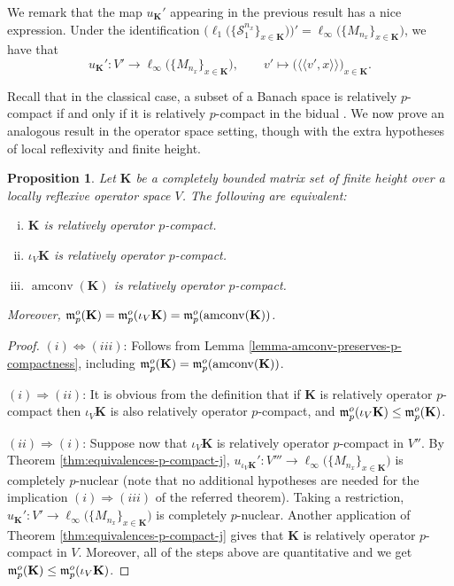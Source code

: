 \documentclass[11pt]{amsart}
\DeclareMathOperator{\amconv}{amconv}
\newcommand{\mpair}[2]{{\langle\langle #1, #2 \rangle\rangle}}
\newtheorem{proposition}[theorem]{Proposition}
\numberwithin{equation}{section}
\begin{document}
We remark that the map $u_{\mathbf{K}}'$ appearing in the previous result has a nice expression. Under the identification $ \big( \ell_1\big( \{ \mathcal{S}^{n_x}_1 \}_{x \in \mathbf{K}}\big) \big)' = \ell_\infty\big( \{ M_{n_x} \}_{x \in \mathbf{K}}\big) $, we have that
$$
u_\mathbf{K}' : V' \to \ell_\infty\big( \{M_{n_x}\}_{x \in \mathbf{K}} \big), \qquad v' \mapsto \big( \mpair{v'}{x}  \big)_{x\in \mathbf{K}}.
$$


Recall that in the classical case, a subset of a Banach space is relatively $p$-compact if and only if it is relatively $p$-compact in the bidual \cite[Thm. 2.4]{Galicer-Lassalle-Turco}.
We now prove an analogous result in the operator space setting, though with the extra hypotheses of local reflexivity and finite height.



\begin{proposition}\label{prop-compactness-in-bidual-for-sets}
Let $\mathbf{K}$ be a completely bounded matrix set of finite height over a locally reflexive operator space $V$.
The following are equivalent:
\begin{enumerate}[(i)]
\item $\mathbf{K}$ is relatively operator $p$-compact.
\item $\iota_V\mathbf{K}$ is relatively operator $p$-compact.
\item $\amconv(\mathbf{K})$ is relatively operator $p$-compact.
\end{enumerate}
Moreover,
$\frak m_p^o(\mathbf{K}) = \frak m_p^o(\iota_V \mathbf{K}) = \frak m_p^o(\amconv(\mathbf{K}))$.
\end{proposition}

\begin{proof}
$(i) \Leftrightarrow (iii)$: Follows from Lemma \ref{lemma-amconv-preserves-p-compactness}, including $\frak m_p^o(\mathbf{K}) = \frak m_p^o(\amconv(\mathbf{K}))$.

$(i) \Rightarrow (ii)$: It is obvious from the definition that if $\mathbf{K}$ is relatively operator $p$-compact then $\iota_V\mathbf{K}$ is also relatively operator $p$-compact, and $\frak m_p^o(\iota_V \mathbf{K}) \le \frak m_p^o(\mathbf{K})$.

$(ii) \Rightarrow (i)$: Suppose now that $\iota_V\mathbf{K}$ is relatively operator $p$-compact in $V''$. 
 By Theorem \ref{thm:equivalences-p-compact-j},
 $u_{\iota_V \mathbf{K}}' : V''' \to \ell_\infty\big( \{M_{n_x}\}_{x \in \mathbf{K}} \big)$ is completely $p$-nuclear (note that no additional hypotheses are needed for the implication $(i)\Rightarrow (iii)$ of the referred theorem).
 Taking a restriction, $u_\mathbf{K}' : V' \to \ell_\infty\big( \{M_{n_x}\}_{x \in \mathbf{K}} \big)$ is completely $p$-nuclear.
 Another application of Theorem \ref{thm:equivalences-p-compact-j} gives that $\mathbf{K}$ is relatively operator $p$-compact in $V$.
 Moreover, all of the steps above are quantitative and we get $\frak m_p^o(\mathbf{K}) \le \frak m_p^o(\iota_V \mathbf{K})$.
\end{proof}
\end{document}

